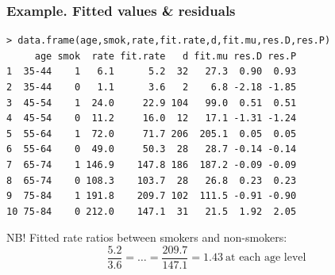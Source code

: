 \documentclass[handout, 12pt]{beamer}
\begin{document}
\begin{frame}[fragile] \frametitle{Example.  Fitted values \& residuals}
 
\small
\begin{verbatim}
> data.frame(age,smok,rate,fit.rate,d,fit.mu,res.D,res.P)
     age smok  rate fit.rate   d fit.mu res.D res.P
1  35-44    1   6.1      5.2  32   27.3  0.90  0.93
2  35-44    0   1.1      3.6   2    6.8 -2.18 -1.85
3  45-54    1  24.0     22.9 104   99.0  0.51  0.51
4  45-54    0  11.2     16.0  12   17.1 -1.31 -1.24
5  55-64    1  72.0     71.7 206  205.1  0.05  0.05
6  55-64    0  49.0     50.3  28   28.7 -0.14 -0.14
7  65-74    1 146.9    147.8 186  187.2 -0.09 -0.09
8  65-74    0 108.3    103.7  28   26.8  0.23  0.23
9  75-84    1 191.8    209.7 102  111.5 -0.91 -0.90
10 75-84    0 212.0    147.1  31   21.5  1.92  2.05
\end{verbatim}
\normalsize

NB! Fitted rate ratios between smokers and non-smokers:
$$ \frac{5.2}{3.6} = \dots = \frac{209.7}{147.1} = 1.43 \ \text{at each age level}$$
\end{frame} 
\end{document}
